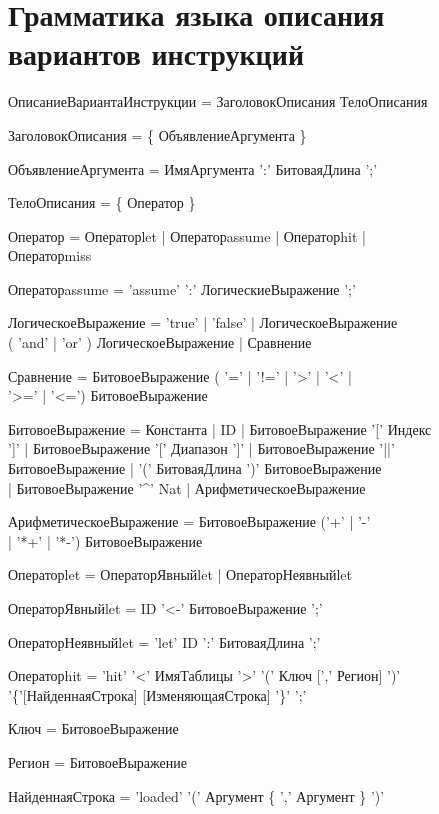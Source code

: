\chapter{Грамматика языка описания вариантов инструкций}\label{sec:syntax}

{\tt

ОписаниеВариантаИнструкции = ЗаголовокОписания ТелоОписания

ЗаголовокОписания = \{ ОбъявлениеАргумента \}

ОбъявлениеАргумента = ИмяАргумента ':' БитоваяДлина ';'

ТелоОписания = \{ Оператор \}

Оператор = Операторlet | Операторassume | Операторhit | \\Операторmiss

Операторassume = 'assume' ':' ЛогическиеВыражение ';'

ЛогическоеВыражение = 'true' | 'false' | ЛогическоеВыражение\\ ( 'and' | 'or' ) ЛогическоеВыражение | Сравнение

Сравнение = БитовоеВыражение ( '=' | '!=' | '>' | '<' | \\ '>='  | '<=') БитовоеВыражение

БитовоеВыражение = Константа | ID | БитовоеВыражение '[' Индекс\\ ']' | БитовоеВыражение '[' Диапазон ']' | БитовоеВыражение '||' \\ БитовоеВыражение | '(' БитоваяДлина ')' БитовоеВыражение \\ | БитовоеВыражение '\^{ }' Nat | АрифметическоеВыражение

АрифметическоеВыражение = БитовоеВыражение ('+' | '-' \\ | '*+' | '*-') БитовоеВыражение

Операторlet = ОператорЯвныйlet | ОператорНеявныйlet

ОператорЯвныйlet = ID '<-' БитовоеВыражение ';'

ОператорНеявныйlet = 'let' ID ':' БитоваяДлина ';'

Операторhit = 'hit' '<' ИмяТаблицы '>' '(' Ключ [',' Регион] ')'\\ '\{'[НайденнаяСтрока] [ИзменяющаяСтрока] '\}' ';'

Ключ = БитовоеВыражение

Регион = БитовоеВыражение

НайденнаяСтрока = 'loaded' '('  Аргумент \{ ',' Аргумент \} ')'

}

